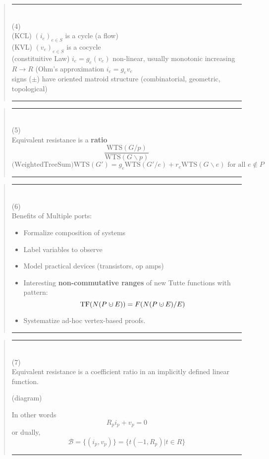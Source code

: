 \documentclass{article}
\newcommand{\dunion}
{\mbox{\hbox{\hskip0.45em$\cdot$\hskip-0.44em$\cup$\hskip0.2em}}}
\begin{document}
\pagebreak[3] \begin{quote}\rule{\textwidth}{3pt}\\
(4)\\
(KCL) $(i_e)_{e\in S}$ is a cycle (a flow)\\
(KVL) $(v_e)_{e\in S}$ is a cocycle\\
(constituitive Law) $i_e=g_e(v_e)$
non-linear, usually monotonic increasing $R\rightarrow R$ 
(Ohm's approximation $i_e=g_ev_e$\\
signs ($\pm$) have oriented matroid structure
(combinatorial, geometric, topological)\\
\rule{\textwidth}{3pt}
\end{quote}

\pagebreak[3] \begin{quote}\rule{\textwidth}{3pt}\\
(5)\\
Equivalent resistance is a \textbf{ratio}
\[
\frac{\mbox{WTS}(G/p)}
{\mbox{WTS}(G\backslash p)}
\]
\[
\mbox{(WeightedTreeSum)}\mbox{WTS}(G') =
g_e \mbox{WTS}(G'/e) + r_e \mbox{WTS} (G \backslash e)
\text{\ for all\ }e \not\in P
\]
\rule{\textwidth}{3pt}
\end{quote}


\pagebreak[3] \begin{quote}\rule{\textwidth}{3pt}\\
(6)\\
Benefits of Multiple ports:

\begin{itemize}
\item
Formalize composition of systems\cite{NarayananDecompVS1986}
\item
Label variables to observe
\item
Model practical devices (transistors, op amps)
\item
Interesting \textbf{non-commutative ranges} of
new Tutte functions with pattern:
\[
\text{TF}(N(P\dunion E)) = F(N(P\dunion E)/E)
\]
\item
Systematize ad-hoc vertex-based proofs.
\end{itemize}

\rule{\textwidth}{3pt}
\end{quote}

\pagebreak[3] \begin{quote}\rule{\textwidth}{3pt}\\
(7)\\
Equivalent resistance is a coefficient ratio in an 
implicitly defined linear function.

(diagram)

In other words
\[
R_pi_p + v_p = 0
\]
or dually,
\[
\mathcal{B} = \{(i_p,v_p)\}
= \{ t(-1, R_p) | t\in R\}
\]

\rule{\textwidth}{3pt}
\end{quote}
\end{document}
